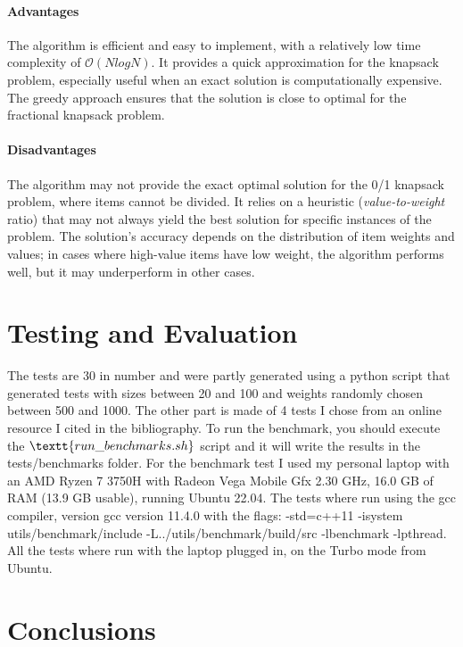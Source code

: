\documentclass[runningheads]{llncs}
\begin{document}
\paragraph{Advantages}
The algorithm is efficient and easy to implement, with a relatively low time complexity of 
$\mathcal{O}(NlogN)$. It provides a quick approximation for the knapsack problem, especially useful
when an exact solution is computationally expensive. The greedy approach ensures that the solution
is close to optimal for the fractional knapsack problem.

\paragraph{Disadvantages}
The algorithm may not provide the exact optimal solution for the 0/1 knapsack problem, where items
cannot be divided. It relies on a heuristic (\textit{value-to-weight} ratio) that may not always
yield the best solution for specific instances of the problem. The solution's accuracy depends on 
the distribution of item weights and values; in cases where high-value items have low weight, the 
algorithm performs well, but it may underperform in other cases.

\section{Testing and Evaluation}
The tests are 30 in number and were partly generated using a python script that generated tests with
sizes between 20 and 100 and weights randomly chosen between 500 and 1000. The other part is made of
4 tests I chose from an online resource I cited in the bibliography. To run the benchmark, you should
execute the $\textt{run\_benchmarks.sh}$ script and it will write the results in the 
tests/benchmarks folder.
For the benchmark test I used my personal laptop with an AMD Ryzen 7 3750H with Radeon Vega Mobile
Gfx 2.30 GHz, 16.0 GB of RAM (13.9 GB usable), running Ubuntu 22.04. The tests where run using the
gcc compiler, version gcc version 11.4.0 with the flags: -std=c++11 -isystem utils/benchmark/include 
-L../utils/benchmark/build/src -lbenchmark -lpthread. All the tests where run with the laptop plugged
in, on the Turbo mode from Ubuntu.

\section{Conclusions}
\end{document}
